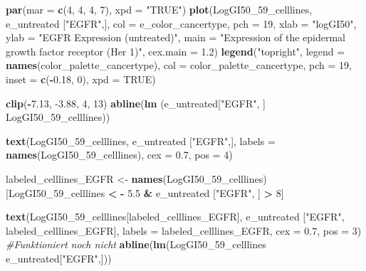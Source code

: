 \documentclass[]{article}
\newenvironment{Shaded}{\begin{snugshade}}{\end{snugshade}}
\newcommand{\CommentTok}[1]{\textcolor[rgb]{0.56,0.35,0.01}{\textit{#1}}}
\newcommand{\DataTypeTok}[1]{\textcolor[rgb]{0.13,0.29,0.53}{#1}}
\newcommand{\DecValTok}[1]{\textcolor[rgb]{0.00,0.00,0.81}{#1}}
\newcommand{\FloatTok}[1]{\textcolor[rgb]{0.00,0.00,0.81}{#1}}
\newcommand{\KeywordTok}[1]{\textcolor[rgb]{0.13,0.29,0.53}{\textbf{#1}}}
\newcommand{\NormalTok}[1]{#1}
\newcommand{\OperatorTok}[1]{\textcolor[rgb]{0.81,0.36,0.00}{\textbf{#1}}}
\newcommand{\OtherTok}[1]{\textcolor[rgb]{0.56,0.35,0.01}{#1}}
\newcommand{\StringTok}[1]{\textcolor[rgb]{0.31,0.60,0.02}{#1}}
\begin{document}
\begin{Shaded}
\begin{Highlighting}[]
\KeywordTok{par}\NormalTok{(}\DataTypeTok{mar =} \KeywordTok{c}\NormalTok{(}\DecValTok{4}\NormalTok{, }\DecValTok{4}\NormalTok{, }\DecValTok{4}\NormalTok{, }\DecValTok{7}\NormalTok{), }\DataTypeTok{xpd =} \StringTok{"TRUE"}\NormalTok{)}
\KeywordTok{plot}\NormalTok{(LogGI50_}\DecValTok{59}\NormalTok{_celllines, e_untreated [}\StringTok{"EGFR"}\NormalTok{,], }
      \DataTypeTok{col =}\NormalTok{ e_color_cancertype, }
      \DataTypeTok{pch =} \DecValTok{19}\NormalTok{, }
     \DataTypeTok{xlab =} \StringTok{"logGI50"}\NormalTok{, }
     \DataTypeTok{ylab =} \StringTok{"EGFR Expression (untreated)"}\NormalTok{,        }
     \DataTypeTok{main =} \StringTok{"Expression of the epidermal growth factor receptor (Her 1)"}\NormalTok{,}
     \DataTypeTok{cex.main =} \FloatTok{1.2}\NormalTok{)}
\KeywordTok{legend}\NormalTok{(}\StringTok{"topright"}\NormalTok{, }
    \DataTypeTok{legend =} \KeywordTok{names}\NormalTok{(color_palette_cancertype), }
    \DataTypeTok{col =}\NormalTok{ color_palette_cancertype, }
    \DataTypeTok{pch =} \DecValTok{19}\NormalTok{,}
    \DataTypeTok{inset =} \KeywordTok{c}\NormalTok{(}\OperatorTok{-}\FloatTok{0.18}\NormalTok{, }\DecValTok{0}\NormalTok{),}
    \DataTypeTok{xpd =} \OtherTok{TRUE}\NormalTok{)}

\KeywordTok{clip}\NormalTok{(}\OperatorTok{-}\FloatTok{7.13}\NormalTok{, }\FloatTok{-3.88}\NormalTok{,  }\DecValTok{4}\NormalTok{, }\DecValTok{13}\NormalTok{)}
\KeywordTok{abline}\NormalTok{(}\KeywordTok{lm}\NormalTok{ (e_untreated[}\StringTok{"EGFR"}\NormalTok{, ]}\OperatorTok{~}\StringTok{ }\NormalTok{LogGI50_}\DecValTok{59}\NormalTok{_celllines))}

\KeywordTok{text}\NormalTok{(LogGI50_}\DecValTok{59}\NormalTok{_celllines, e_untreated [}\StringTok{"EGFR"}\NormalTok{,], }
     \DataTypeTok{labels  =} \KeywordTok{names}\NormalTok{(LogGI50_}\DecValTok{59}\NormalTok{_celllines),}
     \DataTypeTok{cex =} \FloatTok{0.7}\NormalTok{, }
     \DataTypeTok{pos =} \DecValTok{4}\NormalTok{)}

\NormalTok{labeled_celllines_EGFR <-}\StringTok{ }\KeywordTok{names}\NormalTok{(LogGI50_}\DecValTok{59}\NormalTok{_celllines)[LogGI50_}\DecValTok{59}\NormalTok{_celllines }\OperatorTok{<}\StringTok{ }\OperatorTok{-}\StringTok{ }\FloatTok{5.5}
                                                        \OperatorTok{&}\StringTok{ }\NormalTok{e_untreated [}\StringTok{"EGFR"}\NormalTok{, ] }\OperatorTok{>}\StringTok{ }\DecValTok{8}\NormalTok{]}

\KeywordTok{text}\NormalTok{(LogGI50_}\DecValTok{59}\NormalTok{_celllines[labeled_celllines_EGFR], e_untreated [}\StringTok{"EGFR"}\NormalTok{, labeled_celllines_EGFR], }
     \DataTypeTok{labels =}\NormalTok{ labeled_celllines_EGFR,}
     \DataTypeTok{cex =} \FloatTok{0.7}\NormalTok{,}
     \DataTypeTok{pos =} \DecValTok{3}\NormalTok{)}
\CommentTok{#Funktioniert noch nicht}
\KeywordTok{abline}\NormalTok{(}\KeywordTok{lm}\NormalTok{(LogGI50_}\DecValTok{59}\NormalTok{_celllines }\OperatorTok{~}\StringTok{ }\NormalTok{e_untreated[}\StringTok{"EGFR"}\NormalTok{,]))}
\end{Highlighting}
\end{Shaded}
\end{document}
